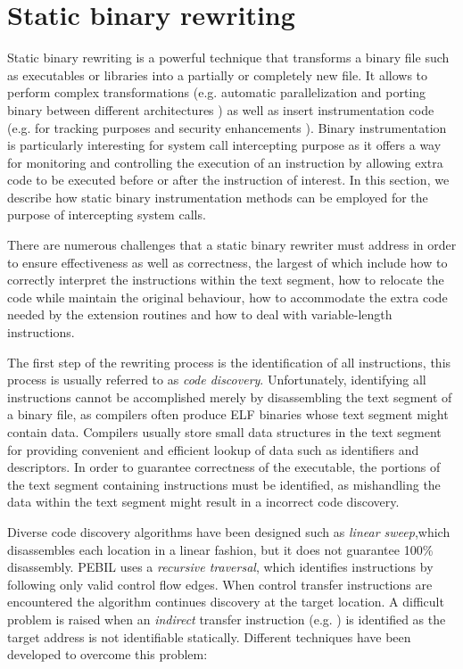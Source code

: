  
\section{Static binary rewriting}
\label{static_rewriting}

Static binary rewriting  is a powerful technique that transforms a binary file such as executables or libraries into a partially or completely new file. It allows to perform complex transformations (e.g. automatic parallelization \cite{Kotha:2010:APB:1934902.1934997} and porting binary between different architectures \cite{Sites:1993:BT:151220.151227}) as well as insert instrumentation code (e.g. for tracking purposes \cite{PEBIL} and security enhancements \cite{SEC1, SEC2}). Binary instrumentation  is particularly interesting for system call intercepting purpose as it offers a way for monitoring and controlling the execution of an instruction by allowing extra code to be executed before or after the instruction of interest. In this section, we describe how static binary instrumentation methods can be employed for the purpose of intercepting system calls.

There are numerous challenges that a static binary rewriter must address in order to ensure effectiveness as well as correctness, the largest of which include how to correctly interpret the instructions within the text segment, how to relocate the code while maintain the original behaviour,  how to accommodate the extra code needed by the extension routines and how to deal with variable-length instructions. 

The first step of the rewriting process is the identification of all instructions, this process is usually referred to as \emph{code discovery}. Unfortunately, identifying all instructions cannot be accomplished merely by disassembling the text segment of a binary file, as compilers often produce ELF binaries whose text segment might contain data. Compilers usually store small data structures in the text segment for providing convenient and efficient lookup of data such as identifiers and descriptors. In order to guarantee correctness of the executable, the portions of the text segment containing instructions must be identified, as mishandling the data within the text segment might result in a incorrect code discovery.

Diverse code discovery algorithms have been designed \cite{PEBIL, REINS, SEC1, SEC2} such as \emph{linear sweep},which disassembles each location in a linear fashion, but it does not guarantee 100\% disassembly. PEBIL \cite{PEBIL} uses a \emph{recursive traversal}, which identifies instructions by following only valid control flow edges. When control transfer instructions are encountered the algorithm continues discovery at the target location. A difficult problem is raised when an \emph{indirect} transfer instruction  (e.g. ) is identified as the target address is not identifiable statically. Different techniques have been developed to overcome this problem: 

